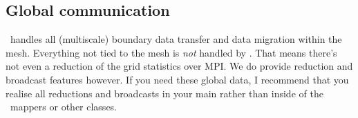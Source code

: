  

\subsection{Global communication}

\Peano\ handles all (multiscale) boundary data transfer and data migration
within the mesh.
Everything not tied to the mesh is \emph{not} handled by \Peano.
That means there's not even a reduction of the grid statistics over MPI.
We do provide reduction and broadcast features however. 
If you need these global data, I recommend that you realise all reductions and
broadcasts in your main rather than inside of the \Peano\ mappers or other
classes.



 